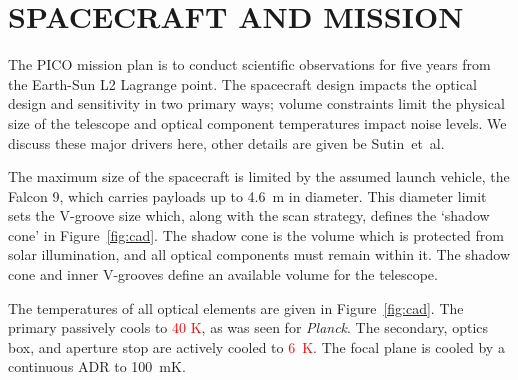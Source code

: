 \documentclass[]{spie}  %
\newcommand{\comr}[1]{\textcolor{red}{#1}}
\begin{document}






\section{SPACECRAFT AND MISSION}
\label{sec:spacecraft}


The PICO mission plan is to conduct scientific observations for five years from the Earth-Sun L2 Lagrange point. The spacecraft design impacts 
the optical design and sensitivity in two primary ways; volume constraints limit the physical size of the telescope and optical component 
temperatures impact noise levels.  We discuss these major drivers here, other details are given be Sutin~et~al.\cite{brian_spie} %

The maximum size of the spacecraft is limited by the assumed launch vehicle, the Falcon 9, which carries payloads up to 4.6~m in diameter. 
This diameter limit sets the V-groove size which, along with the scan strategy, defines the `shadow cone' in Figure~\ref{fig:cad}.  
The shadow cone is the volume which is protected from solar illumination, and all optical components must remain within it. The shadow cone and 
inner V-grooves define an available volume for the telescope.

The temperatures of all optical elements are given in Figure~\ref{fig:cad}.  The primary passively cools to \comr{40 K}, as was 
seen for \textit{Planck}\cite{planck2011_hfi_temp}.  The secondary, optics box, and aperture stop are actively cooled to \comr{6~K}.  The focal plane is cooled 
by a continuous ADR to 100~mK.
\end{document}
